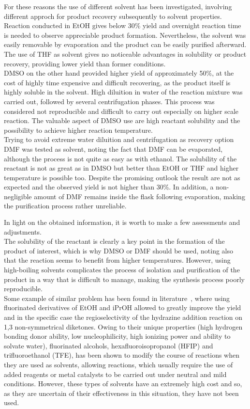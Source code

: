 \documentclass[../Master.tex]{subfiles}
\begin{document}
For these reasons the use of different solvent has been investigated, involving different approch for product recovery subsequently to solvent properties. \\
Reaction conducted in EtOH gives below 30\% yield and overnight reaction time is needed to observe appreciable product formation. Nevertheless, the solvent was easily removable by evaporation and the product can be easily purified afterward.\\
The use of THF as solvent gives no noticeable advantages in solubility or product recovery, providing lower yield than former conditions.\\
DMSO on the other hand provided higher yield of approximately 50\%, at the cost of highly time expensive and difficult recovering, as the product itself is highly soluble in the solvent. High diluition in water of the reaction mixture was carried out, followed by several centrifugation phases. This process was considered not reproducible and difficult to carry out especially on higher scale reaction. The valuable aspect of DMSO use are high reactant solubility and the possibility to achieve higher reaction temperature.\\
Trying to avoid extreme water diluition and centrifugation as recovery option DMF was tested as solvent, noting the fact that DMF can be evaporated, although the process is not quite as easy as with ethanol. The solubility of the reactant is not as great as in DMSO but better than EtOH or THF and higher temperature is possible too. Despite the promising outlook the result are not as expected and the observed yield is not higher than 30\%. In addition, a non-negligible amount of DMF remains inside the flask following evaporation, making the purification process rather unreliable.

In light on the obtained information, it is worth to make a few assessments and adjustments.\\
The solubility of the reactant is clearly a key point in the formation of the product of interest, which is why DMSO or DMF should be used, noting also that the reaction seems to benefit from higher temperatures. However, using high-boiling solvents complicates the process of isolation and purification of the product in a way that is difficult to manage, making the synthesis process poorly reproducible.\\
Some example of similar problem has been found in literature\ \cite{fustero_improved_2008}, where using fluorinated derivatives of EtOH and iPrOH allowed to greatly improve the yield and in the specific case the regioselectivity of the hydrazine addition reaction on 1,3 non-symmetrical diketones. Owing to their unique properties (high hydrogen bonding donor ability, low nucleophilicity, high ionizing power and ability to solvate water), fluorinated alcohols, hexafluoroisopropanol (HFIP) and trifluoroethanol (TFE), has been shown to modify the course of reactions when they are used as solvents, allowing reactions, which usually require the use of added reagents or metal catalysts to be carried out under neutral and mild conditions.
However, these types of solvents have an extremely high cost and so, as they are uncertain of their effectiveness in this situation, they have not been used.
\end{document}
